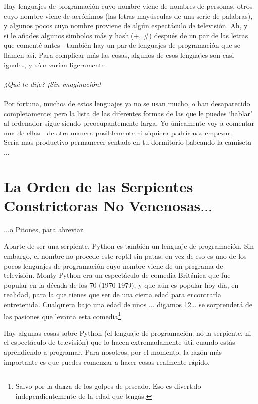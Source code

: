 Hay lenguajes de programación cuyo nombre viene de nombres de personas, otros cuyo nombre viene de acrónimos (las letras mayúsculas de una serie de palabras), y algunos pocos cuyo nombre proviene de algún espectáculo de televisión. Ah, y si le añades algunos simbolos más y hash (+, \#) después de un par de las letras que comenté antes---también hay un par de lenguajes de programación que se llamen así. Para complicar más las cosas, algunos de esos lenguajes son casi iguales, y sólo varían ligeramente.
\\
\\
\emph{¿Qué te dije? ¡Sin imaginación!}
\\
\\
Por fortuna, muchos de estos lenguajes ya no se usan mucho, o han desaparecido completamente; pero la lista de las diferentes formas de las que le puedes `hablar' al ordenador sigue siendo preocupantemente larga. Yo únicamente voy a comentar una de ellas---de otra manera posiblemente ni siquiera podríamos empezar.
\\
Sería mas productivo permanecer sentado en tu dormitorio babeando la camiseta$\ldots$

\section{La Orden de las Serpientes Constrictoras No Venenosas$\ldots$}

$\ldots$o Pitones, para abreviar.

Aparte de ser una serpiente, Python es también un lenguaje de programación. Sin embargo, el nombre no procede este reptil sin patas; en vez de eso es uno de los pocos lenguajes de programación cuyo nombre viene de un programa de televisión. Monty Python era un espectáculo de comedia Británica que fue popular en la década de los 70 (1970-1979), y que aún es popular hoy día, en realidad, para la que tienes que ser de una cierta edad para encontrarla entretenida. Cualquiera bajo una edad de unos $\ldots$ digamos 12$\ldots$ se sorprenderá de las pasiones que levanta esta comedia\footnote{Salvo por la danza de los golpes de pescado. Eso es divertido independientemente de la edad que tengas.}.

Hay algunas cosas sobre Python (el lenguaje de programación, no la serpiente, ni el espectáculo de televisión) que lo hacen extremadamente útil cuando estás aprendiendo a programar. Para nosotros, por el momento, la razón más importante es que puedes comenzar a hacer cosas realmente rápido.

